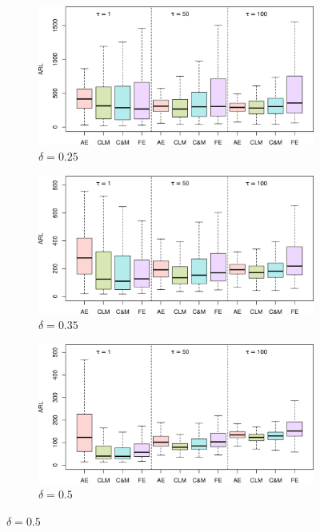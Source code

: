 
\begin{figure}
\centering
\begin{subfigure}{0.49\textwidth}
  \centering
  \caption{$ \delta = 0.25$}
  \label{fig:lambda=0.075/theta=4.0/delta=0.25}
  \includegraphics[width=\textwidth]{img/sims/theta=4.0_signedEWMA(l = 0.075, upw = true, L = 1.0)/delta=0.25.png}
\end{subfigure}
\begin{subfigure}{0.49\textwidth}
  \centering
  \caption{$ \delta = 0.35$}
  \label{fig:lambda=0.075/theta=4.0/delta=0.35}
  \includegraphics[width=\textwidth]{img/sims/theta=4.0_signedEWMA(l = 0.075, upw = true, L = 1.0)/delta=0.35.png}
\end{subfigure}
\begin{subfigure}{0.49\textwidth}
  \centering
  \caption{$ \delta = 0.5$}
  \label{fig:lambda=0.075/theta=4.0/delta=0.5}
  \includegraphics[width=\textwidth]{img/sims/theta=4.0_signedEWMA(l = 0.075, upw = true, L = 1.0)/delta=0.50.png}

\end{subfigure}
\end{figure}
